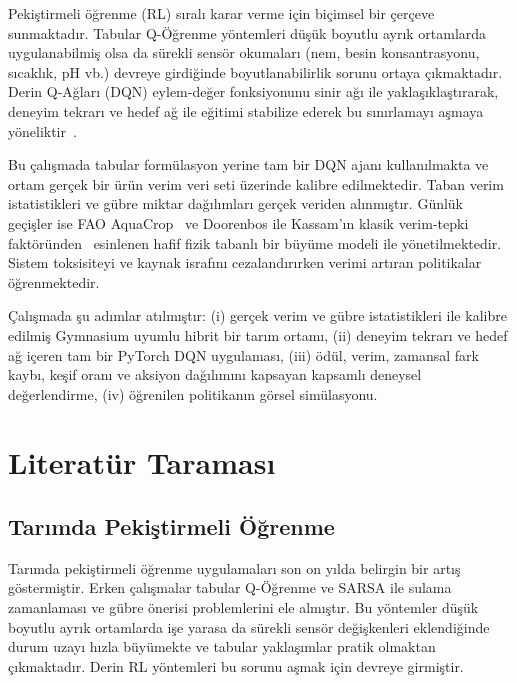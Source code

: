 \documentclass[10pt,twocolumn,a4paper]{article}
\begin{document}
Peki\c{s}tirmeli \"o\u{g}renme (RL) s{\i}ral{\i} karar verme i\c{c}in bi\c{c}imsel bir \c{c}er\c{c}eve sunmaktad{\i}r. Tabular Q-\"O\u{g}renme y\"ontemleri d\"u\c{s}\"uk boyutlu ayr{\i}k ortamlarda uygulanabilmi\c{s} olsa da s\"urekli sens\"or okumalar{\i} (nem, besin konsantrasyonu, s{\i}cakl{\i}k, pH vb.) devreye girdi\u{g}inde boyutlanabilirlik sorunu ortaya \c{c}{\i}kmaktad{\i}r. Derin Q-A\u{g}lar{\i} (DQN) eylem-de\u{g}er fonksiyonunu sinir a\u{g}{\i} ile yakla\c{s}{\i}kla\c{s}t{\i}rarak, deneyim tekrar{\i} ve hedef a\u{g} ile e\u{g}itimi stabilize ederek bu s{\i}n{\i}rlamay{\i} a\c{s}maya y\"oneliktir~\cite{mnih2015human}.

Bu \c{c}al{\i}\c{s}mada tabular form\"ulasyon yerine tam bir DQN ajan{\i} kullan{\i}lmakta ve ortam ger\c{c}ek bir \"ur\"un verim veri seti \"uzerinde kalibre edilmektedir. Taban verim istatistikleri ve g\"ubre miktar da\u{g}{\i}l{\i}mlar{\i} ger\c{c}ek veriden al{\i}nm{\i}\c{s}t{\i}r. G\"unl\"uk ge\c{c}i\c{s}ler ise FAO AquaCrop~\cite{raes2009aquacrop} ve Doorenbos ile Kassam'{\i}n klasik verim-tepki fakt\"or\"unden~\cite{doorenbos1979} esinlenen hafif fizik tabanl{\i} bir b\"uy\"ume modeli ile y\"onetilmektedir. Sistem toksisiteyi ve kaynak israf{\i}n{\i} cezaland{\i}r{\i}rken verimi art{\i}ran politikalar \"o\u{g}renmektedir.

\c{C}al{\i}\c{s}mada \c{s}u ad{\i}mlar at{\i}lm{\i}\c{s}t{\i}r: (i) ger\c{c}ek verim ve g\"ubre istatistikleri ile kalibre edilmi\c{s} Gymnasium uyumlu hibrit bir tar{\i}m ortam{\i}, (ii) deneyim tekrar{\i} ve hedef a\u{g} i\c{c}eren tam bir PyTorch DQN uygulamas{\i}, (iii) \"od\"ul, verim, zamansal fark kayb{\i}, ke\c{s}if oran{\i} ve aksiyon da\u{g}{\i}l{\i}m{\i}n{\i} kapsayan kapsaml{\i} deneysel de\u{g}erlendirme, (iv) \"o\u{g}renilen politikan{\i}n g\"orsel sim\"ulasyonu.

\section{Literat\"ur Taramas{\i}}
\subsection{Tar{\i}mda Peki\c{s}tirmeli \"O\u{g}renme}
Tar{\i}mda peki\c{s}tirmeli \"o\u{g}renme uygulamalar{\i} son on y{\i}lda belirgin bir art{\i}\c{s} g\"ostermi\c{s}tir. Erken \c{c}al{\i}\c{s}malar tabular Q-\"O\u{g}renme ve SARSA ile sulama zamanlamas{\i} ve g\"ubre \"onerisi problemlerini ele alm{\i}\c{s}t{\i}r. Bu y\"ontemler d\"u\c{s}\"uk boyutlu ayr{\i}k ortamlarda i\c{s}e yarasa da s\"urekli sens\"or de\u{g}i\c{s}kenleri eklendi\u{g}inde durum uzay{\i} h{\i}zla b\"uy\"umekte ve tabular yakla\c{s}{\i}mlar pratik olmaktan \c{c}{\i}kmaktad{\i}r. Derin RL y\"ontemleri bu sorunu a\c{s}mak i\c{c}in devreye girmi\c{s}tir.
\end{document}
